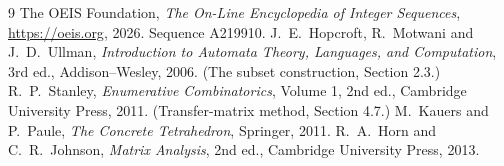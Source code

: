 \documentclass[11pt,a4paper]{article}
\theoremstyle{plain}
\theoremstyle{definition}
\begin{document}
\begin{thebibliography}{9}
 The OEIS Foundation, \emph{The On-Line Encyclopedia of Integer
Sequences}, \url{https://oeis.org}, 2026. Sequence A219910.
 J.~E.~Hopcroft, R.~Motwani and J.~D.~Ullman, \emph{Introduction to Automata
Theory, Languages, and Computation}, 3rd ed., Addison--Wesley, 2006. (The subset
construction, Section 2.3.)
 R.~P.~Stanley, \emph{Enumerative Combinatorics}, Volume 1, 2nd ed.,
Cambridge University Press, 2011. (Transfer-matrix method, Section 4.7.)
 M.~Kauers and P.~Paule, \emph{The Concrete Tetrahedron}, Springer, 2011.
 R.~A.~Horn and C.~R.~Johnson, \emph{Matrix Analysis}, 2nd ed., Cambridge
University Press, 2013.
\end{thebibliography}
\end{document}

